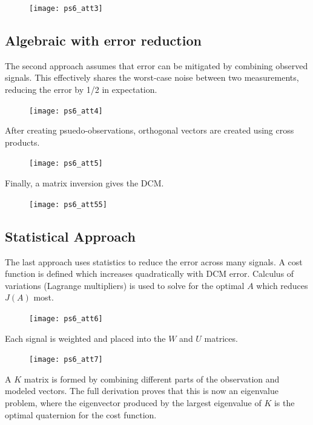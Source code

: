 \documentclass[12pt, letterpaper]{article}
\begin{document}
\begin{figure}[H]
	\centering
	\texttt{[image: ps6\_att3]}
\end{figure}


\subsection{Algebraic with error reduction}
The second approach assumes that error can be mitigated by combining observed signals. This effectively shares the worst-case noise between two measurements, reducing the error by 1/2 in expectation. 

\begin{figure}[H]
	\centering
	\texttt{[image: ps6\_att4]}
\end{figure}

After creating psuedo-observations, orthogonal vectors are created using cross products.

\begin{figure}[H]
	\centering
	\texttt{[image: ps6\_att5]}
\end{figure}

Finally, a matrix inversion gives the DCM.

\begin{figure}[H]
	\centering
	\texttt{[image: ps6\_att55]}
\end{figure}


\subsection{Statistical Approach}
The last approach uses statistics to reduce the error across many signals. A cost function is defined which increases quadratically with DCM error. Calculus of variations (Lagrange multipliers) is used to solve for the optimal $A$ which reduces $J(A)$ most.

\begin{figure}[H]
	\centering
	\texttt{[image: ps6\_att6]}
\end{figure}

Each signal is weighted and placed into the $W$ and $U$ matrices.

\begin{figure}[H]
	\centering
	\texttt{[image: ps6\_att7]}
\end{figure}

A $K$ matrix is formed by combining different parts of the observation and modeled vectors. The full derivation proves that this is now an eigenvalue problem, where the eigenvector produced by the largest eigenvalue of $K$ is the optimal quaternion for the cost function.
\end{document}

